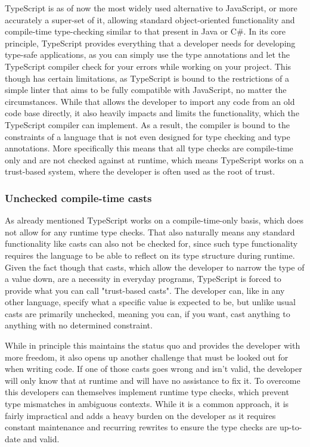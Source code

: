 TypeScript is as of now the most widely used alternative to JavaScript, or more accurately a super-set of it, allowing standard object-oriented functionality and compile-time type-checking similar to that present in Java or C\#. In its core principle, TypeScript provides everything that a developer needs for developing type-safe applications, as you can simply use the type annotations and let the TypeScript compiler check for your errors while working on your project. This though has certain limitations, as TypeScript is bound to the restrictions of a simple linter that aims to be fully compatible with JavaScript, no matter the circumstances. While that allows the developer to import any code from an old code base directly, it also heavily impacts and limits the functionality, which the TypeScript compiler can implement. As a result, the compiler is bound to the constraints of a language that is not even designed for type checking and type annotations. More specifically this means that all type checks are compile-time only and are not checked against at runtime, which means TypeScript works on a trust-based system, where the developer is often used as the root of trust. 

\subsubsection{Unchecked compile-time casts}

As already mentioned TypeScript works on a compile-time-only basis, which does not allow for any runtime type checks. That also naturally means any standard functionality like casts can also not be checked for, since such type functionality requires the language to be able to reflect on its type structure during runtime. Given the fact though that casts, which allow the developer to narrow the type of a value down, are a necessity in everyday programs, TypeScript is forced to provide what you can call "trust-based casts". The developer can, like in any other language, specify what a specific value is expected to be, but unlike usual casts are primarily unchecked, meaning you can, if you want, cast anything to anything with no determined constraint.

While in principle this maintains the status quo and provides the developer with more freedom, it also opens up another challenge that must be looked out for when writing code. If one of those casts goes wrong and isn't valid, the developer will only know that at runtime and will have no assistance to fix it. To overcome this developers can themselves implement runtime type checks, which prevent type mismatches in ambiguous contexts. While it is a common approach, it is fairly impractical and adds a heavy burden on the developer as it requires constant maintenance and recurring rewrites to ensure the type checks are up-to-date and valid.

